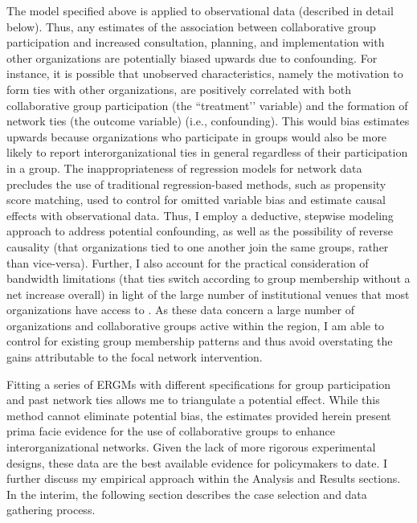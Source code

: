 \documentclass[12pt,a4paper,titlepage]{article}
\begin{document}
The model specified above is applied to observational data (described in detail below). Thus, any estimates of the association between collaborative group participation and increased consultation, planning, and implementation with other organizations are potentially biased upwards due to confounding. For instance, it is possible that unobserved characteristics, namely the motivation to form ties with other organizations, are positively correlated with both collaborative group participation (the ``treatment’’ variable) and the formation of network ties (the outcome variable) (i.e., confounding). This would bias estimates upwards because organizations who participate in groups would also be more likely to report interorganizational ties in general regardless of their participation in a group. The inappropriateness of regression models for network data \parencite{kolaczyk2009,krackhardt1988} precludes the use of traditional regression-based methods, such as propensity score matching, used to control for omitted variable bias and estimate causal effects with observational data. Thus, I employ a deductive, stepwise modeling approach to address potential confounding, as well as the possibility of reverse causality (that organizations tied to one another join the same groups, rather than vice-versa). Further, I also account for the practical consideration of bandwidth limitations (that ties switch according to group membership without a net increase overall) in light of the large number of institutional venues that most organizations have access to \parencite{berardo2010,lubell2010,lubell2011-a,mcallister2014, smaldino2014,niles2012, gerlak2012}. As these data concern a large number of organizations and collaborative groups active within the region, I am able to control for existing group membership patterns and thus avoid overstating the gains attributable to the focal network intervention.

Fitting a series of ERGMs with different specifications for group participation and past network ties allows me to triangulate a potential effect. While this method cannot eliminate potential bias, the estimates provided herein present prima facie evidence for the use of collaborative groups to enhance interorganizational networks. Given the lack of more rigorous experimental designs, these data are the best available evidence for policymakers to date. I further discuss my empirical approach within the Analysis and Results sections. In the interim, the following section describes the case selection and data gathering process.
\end{document}
